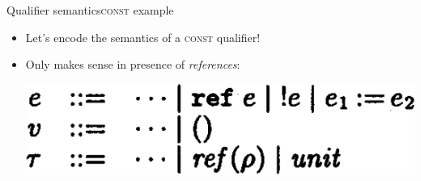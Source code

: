 \documentclass{beamer}
\begin{document}
\begin{frame}{Qualifier semantics}{\textsc{const} example}
  \begin{itemize}
  \item Let's encode the semantics of a \textsc{const} qualifier!
  \item<2-> Only makes sense in presence of \emph{references}:
    \begin{center}
    \includegraphics[scale=0.3]{paper_ref_syntax.png}
    \end{center}
  \end{itemize}
\end{frame}

\end{document}
